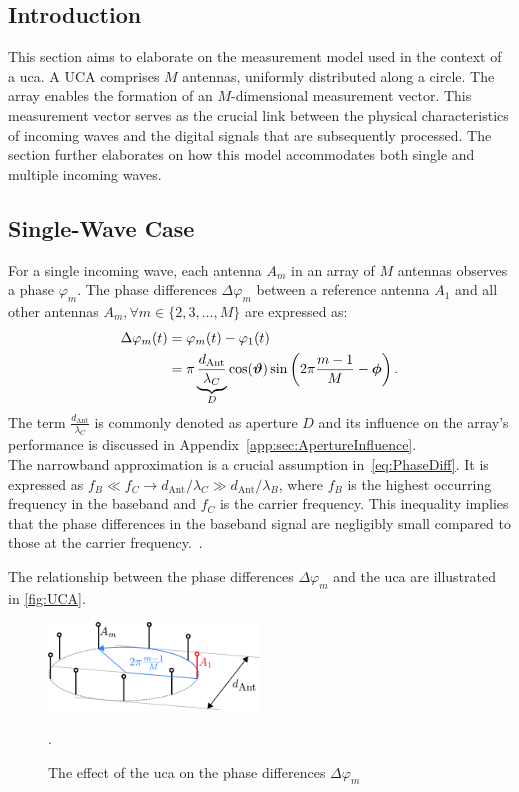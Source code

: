 \subsection{Introduction}
This section aims to elaborate on the measurement model used in the context of a \glsdesc{uca}.
A UCA comprises \( M \) antennas, uniformly distributed along a circle. The array enables the formation of an \( M \)-dimensional measurement
vector.
This measurement vector serves as the crucial link between the physical characteristics of incoming waves and the
digital signals that are subsequently processed.
The section further elaborates on how this model accommodates both single and multiple incoming waves.


\subsection{Single-Wave Case}
For a single incoming wave, each antenna \( A_m \) in an array of \( M \) antennas observes a phase \( \varphi_m \).
The phase differences \( \Delta\varphi_m \) between a reference antenna \( A_1 \) and all other antennas
\( A_m, \forall m \in \{2, 3, \ldots, M\} \) are expressed as:
\begin{align}
    \Delta\varphi_m(t) & = \varphi_m(t) - \varphi_1(t)                                                                                  \\
                       & = \pi \underbrace{\frac{d_{\text{Ant}}}{\lambda_C}}_D \cos(\boldsymbol{\vartheta}) \sin\left(2\pi\frac{m-1}{M}-\boldsymbol{\phi}\right).
    \label{eq:PhaseDiff}
\end{align}
The term \( \frac{d_{\text{Ant}}}{\lambda_C} \) is commonly denoted as aperture \( D \) and its influence on the array's
performance is discussed in Appendix~\ref{app:sec:ApertureInfluence}.\\
The narrowband approximation is a crucial assumption in~\eqref{eq:PhaseDiff}. It is expressed as
\( f_B \ll f_C \rightarrow d_{\text{Ant}}/\lambda_C \gg d_{\text{Ant}}/\lambda_B \), where \( f_B \) is the highest
occurring frequency in the baseband and \( f_C \) is the carrier frequency. This inequality implies that the phase
differences in the baseband signal are negligibly small compared to those at the carrier frequency.~\cite{tuncer.ch3}.

The relationship between the phase differences \( \Delta\varphi_m \) and the \gls{uca} are illustrated in \autoref{fig:UCA}.
\begin{figure}[H]
    \centering
    \includegraphics[width=0.5\textwidth]{figures/02_SignalModel/uca.pdf}
    \caption{The effect of the \gls{uca} on the phase differences \( \Delta\varphi_m \)~\cite{meyer}}.
    \label{fig:UCA}
\end{figure}

